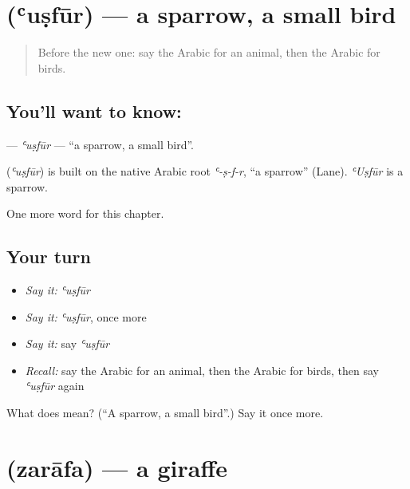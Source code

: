 \section[\texorpdfstring{\ar{عصفور} (ʿuṣfūr)}{عصفور (ʿuṣfūr)}]{ (ʿuṣfūr) — a sparrow, a small bird}

\label{lesson:AR-C276-usfur}



\begin{quote}
Before the new one: say the Arabic for an animal, then the Arabic for birds.
\end{quote}

\subsection*{You'll want to know: }
\textbf{} — \emph{ʿuṣfūr} — \textquotedblleft{}a sparrow, a small bird\textquotedblright{}.

\begin{cousinweb}
\textbf{} (\emph{ʿuṣfūr}) is built on the native Arabic root \emph{ʿ-ṣ-f-r}, \textquotedblleft{}a sparrow\textquotedblright{} (Lane). \emph{ʿUṣfūr} is a sparrow.
\end{cousinweb}

\begin{grammarlens}[title={What you've built}]
One more word for this chapter.
\end{grammarlens}

\subsection*{Your turn}
\begin{itemize}
\raggedright
  \item \emph{Say it:} \emph{ʿuṣfūr}
  \item \emph{Say it:} \emph{ʿuṣfūr}, once more
  \item \emph{Say it:} say \emph{ʿuṣfūr}
  \item \emph{Recall:} say the Arabic for an animal, then the Arabic for birds, then say \emph{ʿuṣfūr} again
\end{itemize}

\begin{tcolorbox}[breakable,colback=teal!4,colframe=teal!35!black,title={Before you move on}]
What does  mean? (\textquotedblleft{}A sparrow, a small bird\textquotedblright{}.) Say it once more.
\end{tcolorbox}
\section[\texorpdfstring{\ar{زرافة} (zarāfa)}{زرافة (zarāfa)}]{ (zarāfa) — a giraffe}

